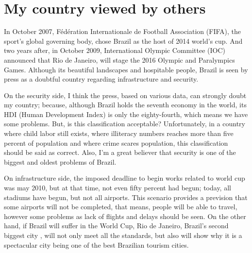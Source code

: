 \documentclass[a4paper,12pt]{article}
\begin{document}
\titleTMB 
\newpage
{} %

\section{My country viewed by others}


In October 2007, Fédération Internationale de Football Association (FIFA), the
sport's global governing body, chose Brazil as the host of 2014 world's cup.
And two years after, in October 2009, International Olympic Committee (IOC)
announced  that Rio de Janeiro,  will stage  the 2016  Olympic  and Paralympics
Games.  
Although its beautiful landscapes and hospitable people,
Brazil  is seen  by press  as a  doubtful country  regarding  infrastructure and
security.

On the security side, I think the press, based on various data, can strongly doubt my country;
because, although Brazil holds the seventh economy in the world, its HDI (Human
Development Index) is only the eighty-fourth, which means we have some problems.
But, is this  classification acceptable? Unfortunately, in a  country where child
labor still exists, where illiteracy numbers
reaches more  than five percent of  population and  where crime scares
population, this  classification should  be said as  correct. Also, I'm  a great
believer that security is one of the biggest and oldest problems of Brazil.


On infrastructure side, the imposed deadline to begin works related to
world cup was may 2010, but at that time, not even fifty percent had begun; today, 
all stadiums have begun, but not all airports. 
This scenario  provides a  prevision that some  airports will not  be completed,
that means, people will be able to travel, however some problems as lack of flights and  delays should be seen.
On the  other hand,  if Brazil  will suffer in  the World  Cup, Rio  de Janeiro,
Brazil's second  biggest city , will not  only meet all the  standards, but also
will show why it is a spectacular city being one of the best Brazilian tourism cities.



\end{document}
